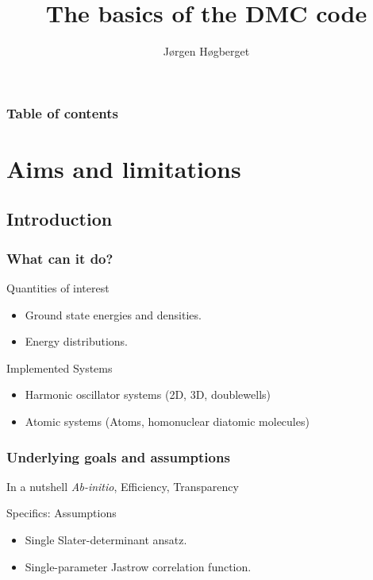\documentclass{beamer}
\begin{document}
\title{The basics of the DMC code}
\author{Jørgen Høgberget}
\date{} 

\begin{frame}
\titlepage
\end{frame}

\begin{frame}\frametitle{Table of contents}\tableofcontents
\end{frame} 


\section{Aims and limitations} 
\subsection{Introduction}

\begin{frame}\frametitle{What can it do?} 

\begin{alertblock}{Quantities of interest}
\begin{itemize}
 \item Ground state energies and densities.
 \item Energy distributions.
\end{itemize}
\end{alertblock}

\pause
\begin{alertblock}{Implemented Systems}
\begin{itemize}
\item Harmonic oscillator systems (2D, 3D, doublewells)
\item Atomic systems (Atoms, homonuclear diatomic molecules)
\end{itemize}
\end{alertblock}

\end{frame}

\begin{frame}\frametitle{Underlying goals and assumptions}

\begin{alertblock}{In a nutshell}
 \textit{Ab-initio}, Efficiency, Transparency
\end{alertblock}

\pause

\begin{alertblock}{Specifics: Assumptions}
\begin{itemize}
 \item Single Slater-determinant ansatz.
 \item Single-parameter Jastrow correlation function.
\end{itemize}
\end{alertblock}

\end{frame}
\end{document}
